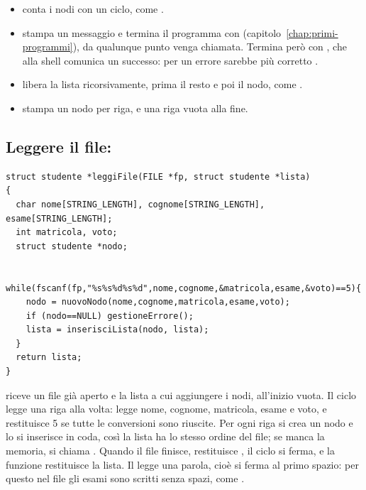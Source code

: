 \begin{itemize}
  \item {} conta i nodi con un ciclo, come
        .
  \item {} stampa un messaggio e termina il programma con
         (capitolo~\ref{chap:primi-programmi}), da qualunque
        punto venga chiamata. Termina però con , che alla
        shell comunica un successo: per un errore sarebbe più corretto
        .
  \item {} libera la lista ricorsivamente, prima il resto e poi
        il nodo, come .
  \item {} stampa un nodo per riga, e una riga vuota alla
        fine.
\end{itemize}

\subsection{Leggere il file: }

\begingroup
\codicepiccolo
\lstset{xleftmargin=19pt, framexleftmargin=15pt}
\begin{lstlisting}[style=c, name=funzioni.c, firstnumber=89]
struct studente *leggiFile(FILE *fp, struct studente *lista)
{
  char nome[STRING_LENGTH], cognome[STRING_LENGTH], esame[STRING_LENGTH];
  int matricola, voto;
  struct studente *nodo;

  while(fscanf(fp,"%s%s%d%s%d",nome,cognome,&matricola,esame,&voto)==5){
    nodo = nuovoNodo(nome,cognome,matricola,esame,voto);
    if (nodo==NULL) gestioneErrore();
    lista = inserisciLista(nodo, lista);
  }
  return lista;
}
\end{lstlisting}
\endgroup

 riceve un file già aperto e la lista a cui aggiungere i
nodi, all'inizio vuota. Il ciclo legge una riga alla volta: 
legge nome, cognome, matricola, esame e voto, e restituisce 5 se tutte le
conversioni sono riuscite. Per ogni riga si crea un nodo e lo si inserisce in
coda, così la lista ha lo stesso ordine del file; se manca la memoria, si
chiama . Quando il file finisce, 
restituisce , il ciclo si ferma, e la funzione restituisce la
lista. Il  legge una parola, cioè si ferma al primo spazio: per
questo nel file gli esami sono scritti senza spazi, come
.

